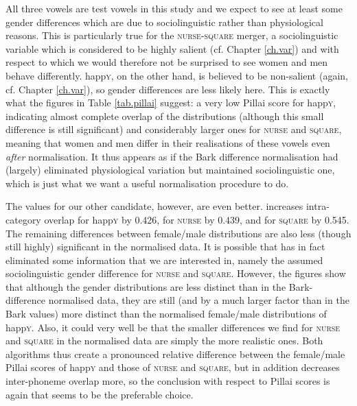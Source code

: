 All three vowels are test vowels in this study and we expect to see at least some gender differences which are due to sociolinguistic rather than physiological reasons.
This is particularly true for the \textsc{nurse-square} merger, a sociolinguistic variable which is considered to be highly salient (cf. Chapter \ref{ch.var}) and with respect to which we would therefore not be surprised to see women and men behave differently.
happ\textsc{y}, on the other hand, is believed to be non-salient (again, cf. Chapter \ref{ch.var}), so gender differences are less likely here.
This is exactly what the figures in Table \ref{tab.pillai} suggest: a very low Pillai score for happ\textsc{y}, indicating almost complete overlap of the distributions (although this small difference is still significant) and considerably larger ones for \textsc{nurse} and \textsc{square}, meaning that women and men differ in their realisations of these vowels even \emph{after} normalisation.
It thus appears as if the Bark difference normalisation had (largely) eliminated physiological variation but maintained sociolinguistic one, which is just what we want a useful normalisation procedure to do.

The values for our other candidate, however, are even better.
\citeauthor{wattfabricius2002} increases intra-category overlap for happ\textsc{y} by 0.426, for \textsc{nurse} by 0.439, and for \textsc{square} by 0.545.
The remaining differences between female/male distributions are also less (though still highly) significant in the \citeauthor{wattfabricius2002} normalised data.
It is possible that \citeauthor{wattfabricius2002} has in fact eliminated some information that we are interested in, namely the assumed sociolinguistic gender difference for \textsc{nurse} and \textsc{square}.
However, the figures show that although the gender distributions are less distinct than in the Bark-difference normalised data, they are still (and by a much larger factor than in the Bark values) more distinct than the normalised female/male distributions of happ\textsc{y}.
Also, it could very well be that the smaller differences we find for \textsc{nurse} and \textsc{square} in the \citeauthor{wattfabricius2002} normalised data are simply the more realistic ones.
Both algorithms thus create a pronounced relative difference between the female/male Pillai scores of happ\textsc{y} and those of \textsc{nurse} and \textsc{square}, but in addition \citeauthor{wattfabricius2002} decreases inter-phoneme overlap more, so the conclusion with respect to Pillai scores is again that \citeauthor{wattfabricius2002} seems to be the preferable choice.

